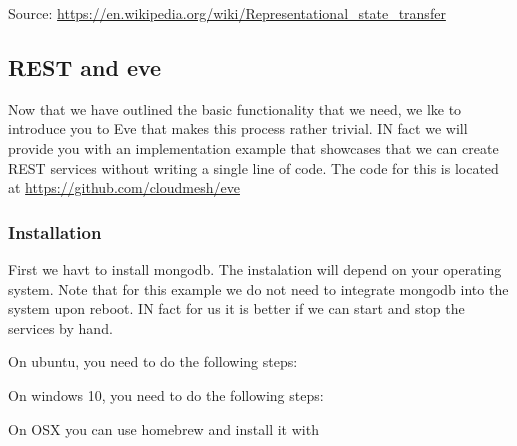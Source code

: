 Source: \url{https://en.wikipedia.org/wiki/Representational\_state\_transfer}


\subsection{REST and eve}
\label{\detokenize{lesson/prg/rest:rest-and-eve}}
Now that we have outlined the basic functionality that we need, we lke
to introduce you to Eve that makes this process rather trivial. IN
fact we will provide you with an implementation example that showcases
that we can create REST services without writing a single line of
code. The code for this is located at \url{https://github.com/cloudmesh/eve}


\subsubsection{Installation}
\label{\detokenize{lesson/prg/rest:installation}}
First we havt to install mongodb. The instalation will depend on your
operating system. Note that for this example we do not need to
integrate mongodb into the system upon reboot. IN fact for us it is
better if we can start and stop the services by hand.

On ubuntu, you need to do the following steps:

\begin{sphinxVerbatim}[commandchars=\\\{\}]
          
\end{sphinxVerbatim}

On windows 10, you need to do the following steps:

\begin{sphinxVerbatim}[commandchars=\\\{\}]
            
  
\end{sphinxVerbatim}

On OSX you can use homebrew and install it with

\begin{sphinxVerbatim}[commandchars=\\\{\}]
 
  
\end{sphinxVerbatim}


